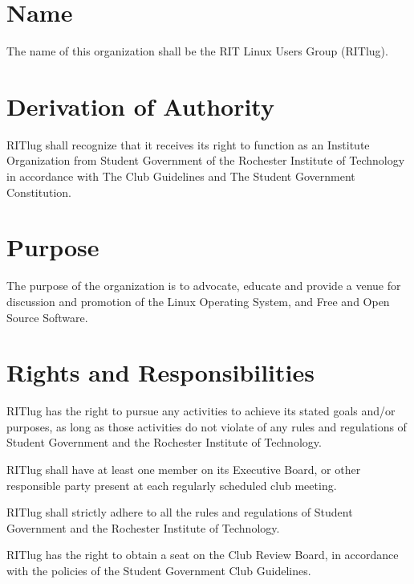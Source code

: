 



\section{Name}
The name of this organization shall be the RIT Linux Users Group (RITlug).

\section{Derivation of Authority}
RITlug shall recognize that it receives its right to function as an Institute Organization from Student Government of the Rochester Institute of Technology in accordance with The Club Guidelines and The Student Government Constitution.

\section{Purpose}
The purpose of the organization is to advocate, educate and provide a venue for discussion and promotion of the Linux Operating System, and Free and Open Source Software.

\section{Rights and Responsibilities}
\begin{subroutines}
\item RITlug has the right to pursue any activities to achieve its stated goals and/or purposes, as long as those activities do not violate of any rules and regulations of Student Government and the Rochester Institute of Technology.
\item RITlug shall have at least one member on its Executive Board, or other responsible party present at each regularly scheduled club meeting.
\item RITlug shall strictly adhere to all the rules and regulations of Student Government and the Rochester Institute of Technology.
\item RITlug has the right to obtain a seat on the Club Review Board, in accordance with the policies of the Student Government Club Guidelines.
\end{subroutines}

